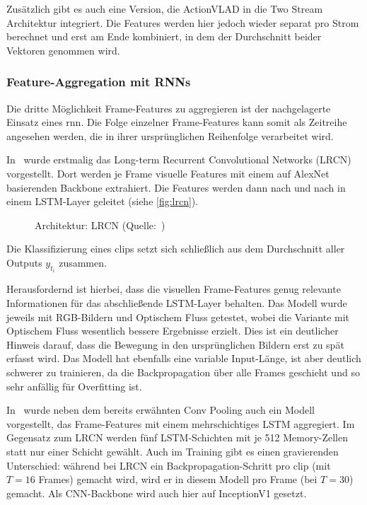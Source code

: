 Zusätzlich gibt es auch eine Version, die ActionVLAD in die Two Stream Architektur integriert.
Die Features werden hier jedoch wieder separat pro Strom berechnet und erst am Ende kombiniert, in dem der Durchschnitt beider Vektoren genommen wird.


\subsubsection{Feature-Aggregation mit RNNs}

Die dritte Möglichkeit Frame-Features zu aggregieren ist der nachgelagerte Einsatz eines \gls{rnn}.
Die Folge einzelner Frame-Features kann somit als Zeitreihe angesehen werden, die in ihrer ursprünglichen Reihenfolge verarbeitet wird.

In~\cite{Donahue14} wurde erstmalig das Long-term Recurrent Convolutional Networks (LRCN) vorgestellt.
Dort werden je Frame visuelle Features mit einem auf AlexNet basierenden Backbone extrahiert.
Die Features werden dann nach und nach in einem LSTM-Layer geleitet (siehe \autoref{fig:lrcn}).

\begin{figure}[h!]
    \centering
    \caption{Architektur: LRCN (Quelle:~\cite{Donahue14})}
    \label{fig:lrcn}
\end{figure}

Die Klassifizierung eines \glspl{clip} setzt sich schließlich aus dem Durchschnitt aller Outputs $y_{t_i}$ zusammen.

Herausfordernd ist hierbei, dass die visuellen Frame-Features genug relevante Informationen für das abschließende LSTM-Layer behalten.
Das Modell wurde jeweils mit RGB-Bildern und Optischem Fluss getestet, wobei die Variante mit Optischem Fluss wesentlich bessere Ergebnisse erzielt.
Dies ist \ua ein deutlicher Hinweis darauf, dass die Bewegung in den ursprünglichen Bildern erst zu spät erfasst wird.
Das Modell hat ebenfalls eine variable Input-Länge, ist aber deutlich schwerer zu trainieren, da die Backpropagation über alle Frames geschieht und so sehr anfällig für Overfitting ist.

In~\cite{Ng15} wurde neben dem bereits erwähnten Conv Pooling auch ein Modell vorgestellt, das Frame-Features mit einem mehrschichtiges LSTM aggregiert.
Im Gegensatz zum LRCN werden fünf LSTM-Schichten mit je 512 Memory-Zellen statt nur einer Schicht gewählt.
Auch im Training gibt es einen gravierenden Unterschied:
während bei LRCN ein Backpropagation-Schritt pro \gls{clip} (mit $T = 16$ Frames) gemacht wird, wird er in diesem Modell pro Frame (bei $T = 30$) gemacht.
Als CNN-Backbone wird auch hier auf InceptionV1 gesetzt.

